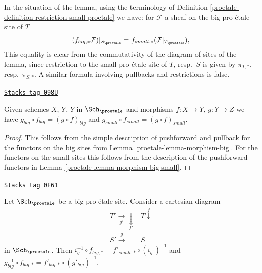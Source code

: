 In the situation of the lemma, using the terminology of
Definition \ref{proetale-definition-restriction-small-proetale}
we have: for $\mathcal{F}$ a sheaf on the big pro-\'etale site of $T$
\begin{equation}
\label{equation-compare-big-small}
(f_{big, *}\mathcal{F})|_{S_\proetale} =
f_{small, *}(\mathcal{F}|_{T_\proetale}),
\end{equation}
This equality is clear from the commutativity of the diagram of
sites of the lemma, since restriction to the small pro-\'etale site of
$T$, resp.\ $S$ is given by $\pi_{T, *}$, resp.\ $\pi_{S, *}$. A similar
formula involving pullbacks and restrictions is false.

\begin{lemma}
\label{proetale-lemma-composition-proetale}
\href{https://stacks.math.columbia.edu/tag/098U}{\texttt{Stacks tag 098U}}

Given schemes $X$, $Y$, $Y$ in $\Sch_\proetale$
and morphisms $f : X \to Y$, $g : Y \to Z$ we have
$g_{big} \circ f_{big} = (g \circ f)_{big}$ and
$g_{small} \circ f_{small} = (g \circ f)_{small}$.
\end{lemma}

\begin{proof}

This follows from the simple description of pushforward
and pullback for the functors on the big sites from
Lemma \ref{proetale-lemma-morphism-big}. For the functors
on the small sites this follows from the description of
the pushforward functors in Lemma \ref{proetale-lemma-morphism-big-small}.
\end{proof}

\begin{lemma}
\label{proetale-lemma-morphism-big-small-cartesian-diagram}
\href{https://stacks.math.columbia.edu/tag/0F61}{\texttt{Stacks tag 0F61}}

Let $\Sch_\proetale$ be a big pro-\'etale site. Consider a cartesian diagram
$$
\begin{array}{cc}T' \underset{g'}{\longrightarrow}\underset{f'}{\downarrow} & T \overset{f}{\downarrow} \\ S' \overset{g}{\longrightarrow} & S\end{array}
$$
in $\Sch_\proetale$. Then
$i_g^{-1} \circ f_{big, *} = f'_{small, *} \circ (i_{g'})^{-1}$
and $g_{big}^{-1} \circ f_{big, *} = f'_{big, *} \circ (g'_{big})^{-1}$.
\end{lemma}

